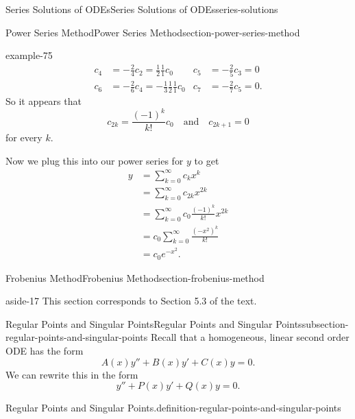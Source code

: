 \documentclass[oneside,10pt,]{book}
\numberwithin{equation}{section}
\newcommand{\qq}[1]{\quad\text{#1}\quad}
\newcommand{\amp}{&}
\begin{document}
\begin{chapterptx}{Series Solutions of ODEs}{}{Series Solutions of ODEs}{}{}{series-solutions}
\begin{sectionptx}{Power Series Method}{}{Power Series Method}{}{}{section-power-series-method}
\begin{example}{}{example-75}
\begin{align*}
c_{4} \amp= -\frac{2}{4}c_{2} = \frac{1}{2}\frac{1}{1}c_{0} \amp c_{5} \amp= -\frac{2}{5}c_{3} = 0\\
c_{6} \amp= -\frac{2}{6}c_{4} = -\frac{1}{3}\frac{1}{2}\frac{1}{1}c_{0} \amp c_{7} \amp= -\frac{2}{7}c_{5} = 0\text{.}
\end{align*}
So it appears that%
\begin{equation*}
c_{2k} = \frac{(-1)^{k}}{k!}c_{0}\qq{and}c_{2k+1} = 0
\end{equation*}
for every \(k\).%
\par
\hypertarget{p-457}{}%
Now we plug this into our power series for \(y\) to get%
\begin{align*}
y \amp= \sum_{k=0}^{\infty}c_{k}x^{k}\\
\amp= \sum_{k=0}^{\infty}c_{2k}x^{2k}\\
\amp= \sum_{k=0}^{\infty}c_{0}\frac{(-1)^{k}}{k!}x^{2k}\\
\amp= c_{0}\sum_{k=0}^{\infty}\frac{(-x^{2})^{k}}{k!}\\
\amp= c_{0}e^{-x^{2}}\text{.}
\end{align*}
%
\end{example}
\end{sectionptx}
%
%
\typeout{************************************************}
\typeout{************************************************}
%
\begin{sectionptx}{Frobenius Method}{}{Frobenius Method}{}{}{section-frobenius-method}
\begin{aside}{}{aside-17}%
\hypertarget{p-458}{}%
This section corresponds to Section 5.3 of the text.%
\end{aside}
%
%
\typeout{************************************************}
\typeout{************************************************}
%
\begin{subsectionptx}{Regular Points and Singular Points}{}{Regular Points and Singular Points}{}{}{subsection-regular-points-and-singular-points}
\hypertarget{p-459}{}%
Recall that a homogeneous, linear second order ODE has the form%
\begin{equation*}
A(x)y''+B(x)y'+C(x)y = 0. 
\end{equation*}
We can rewrite this in the form%
\begin{equation*}
y''+P(x)y'+Q(x)y = 0.
\end{equation*}
%
\begin{definition}{Regular Points and Singular Points.}{definition-regular-points-and-singular-points}%

\end{definition}
\end{subsectionptx}
\end{sectionptx}
\end{chapterptx}
\end{document}

